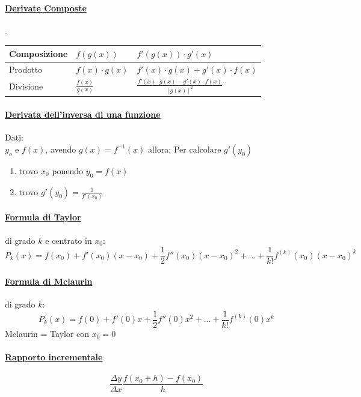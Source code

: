 \documentclass[12pt, a4paper, openany]{book}
\begin{document}
\paragraph*{\underline{Derivate Composte}}.\\

\begin{tabularx}{\textwidth}{|l|Y|Y|}
	\hline
	Composizione & $f(g(x))$           & $ f'(g(x))\cdot g'(x)$                                \\
	\hline
	Prodotto     & $f(x)\cdot g(x)$    & $f'(x)\cdot g(x) + g'(x)\cdot f(x)$                   \\
	\hline
	Divisione    & $\frac{f(x)}{g(x)}$ & $\frac{f'(x)\cdot g(x) - g'(x) \cdot f(x)}{[g(x)]^2}$ \\
	\hline
\end{tabularx}

\paragraph*{\underline{Derivata dell'inversa di una funzione}}
Dati:\\
$y_o$ e $f(x)$, avendo $g(x) = f^{-1}(x)$ allora:
Per calcolare $g'(y_0)$
\begin{enumerate}
	\item trovo $x_0$ ponendo $y_0=f(x)$
	\item trovo $g'(y_0)=\frac{1}{f'(x_0)}$
\end{enumerate}

\paragraph*{\underline{Formula di Taylor}} di grado $k$ e centrato in $x_0$:
$$P_k(x)=f(x_0)+f'(x_0)(x-x_0) + \frac{1}{2}f''(x_0)(x-x_0)^2 +... + \frac{1}{k!}f^{(k)}(x_0)(x-x_0)^k$$

\paragraph*{\underline{Formula di Mclaurin}} di grado $k$:
$$P_k(x)=f(0)+f'(0)x+\frac{1}{2}f''(0)x^2+...+\frac{1}{k!}f^{(k)}(0)x^k$$
\small{Mclaurin = Taylor con $x_0=0$}

\paragraph*{\underline{Rapporto incrementale}}
$$\frac{\Delta y}{ \Delta x}\frac{f(x_0+h)-f(x_0)}{h} $$
\end{document}
